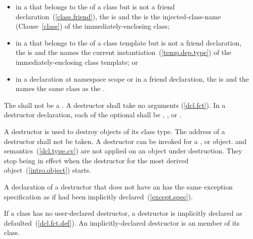 \begin{itemize}
\item
in a  that belongs to the
 of a class but is not a friend
declaration~(\ref{class.friend}), the  is
\tcode{\~} and the  is the
injected-class-name (Clause~\ref{class}) of the immediately-enclosing class;

\item
in a  that belongs to the
 of a class template but is not a friend
declaration, the  is
\tcode{\~} and the  names the
current instantiation~(\ref{temp.dep.type}) of the immediately-enclosing class template; or

\item
in a declaration at namespace scope or in a friend declaration, the
 is 
\tcode{\~} and the  names the
same class as the .
\end{itemize}

The  shall not be a . A
destructor shall take no arguments (\ref{dcl.fct}). In a destructor
declaration, each  of the optional
 shall be , , or
.

\pnum
A destructor is used to destroy objects of its class type.
%
The address of a destructor shall not be taken.
%
%
A destructor can be invoked for a
,
or
object.
and
semantics~(\ref{dcl.type.cv}) are not applied on an object under destruction.
They stop being in effect when the destructor for the
most derived object~(\ref{intro.object}) starts.

\pnum
A declaration of a destructor that does not have an 
has the same exception specification as if had been implicitly declared~(\ref{except.spec}).

\pnum
{}%
%
%
If a class has no user-declared
destructor, a destructor is implicitly
declared as defaulted~(\ref{dcl.fct.def}).
An implicitly-declared destructor is an
member of its class.

